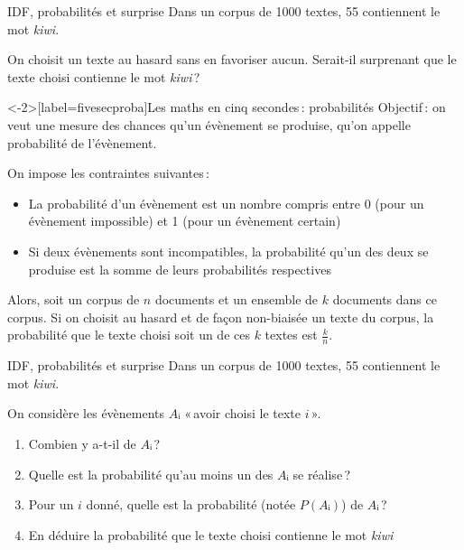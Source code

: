 \documentclass[../allslides.tex]{subfiles}
\begin{document}

\begin{frame}{IDF, probabilités et surprise}
	Dans un corpus de \num{1000} textes, \num{55} contiennent le mot \emph{kiwi}.
	\pause

	On choisit un texte au hasard sans en favoriser aucun. Serait-il surprenant que le texte choisi contienne le mot \emph{kiwi} ?
\end{frame}

\begin{frame}<-2>[label=fivesecproba]{Les maths en cinq secondes : probabilités}
	Objectif : on veut une \alert{mesure} des chances qu'un évènement se produise, qu'on appelle \alert{probabilité} de l'évènement.
	
	\pause
	On impose les contraintes suivantes :
	\begin{itemize}
		\item La probabilité d'un évènement est un nombre compris entre \num{0} (pour un évènement impossible) et \num{1} (pour un évènement certain)
		\item Si deux évènements sont \alert{incompatibles}, la probabilité qu'un des deux se produise est la somme de leurs probabilités respectives
	\end{itemize}
	\itpause
	Alors, soit un corpus de \(n\) documents et un ensemble de \(k\) documents dans ce corpus.
	Si on choisit au hasard et de façon non-biaisée un texte du corpus, la probabilité que le texte choisi soit un de ces \(k\) textes est \(\frac{k}{n}\).
\end{frame}

\begin{frame}{IDF, probabilités et surprise}
	Dans un corpus de \num{1000} textes, \num{55} contiennent le mot \emph{kiwi}.
	
	On considère les évènements \(Aᵢ\) « avoir choisi le texte \(i\) ».
	\pause
	\begin{enumerate}
		\item Combien y a-t-il de \(Aᵢ\) ?  \only<3->{→ \num{1000}}
		\item Quelle est la probabilité qu'au moins un des \(Aᵢ\) se réalise ?  \only<4->{→ \num{1}}
		\item Pour un \(i\) donné, quelle est la probabilité (notée \(P(Aᵢ)\)) de \(Aᵢ\) ?  \only<5->{→ \(\frac{1}{1000}\)}
		\item En déduire la probabilité que le texte choisi contienne le mot \emph{kiwi}  \only<6->{→ \(\frac{55}{1000}\)}
	\end{enumerate}
\end{frame}
\end{document}
